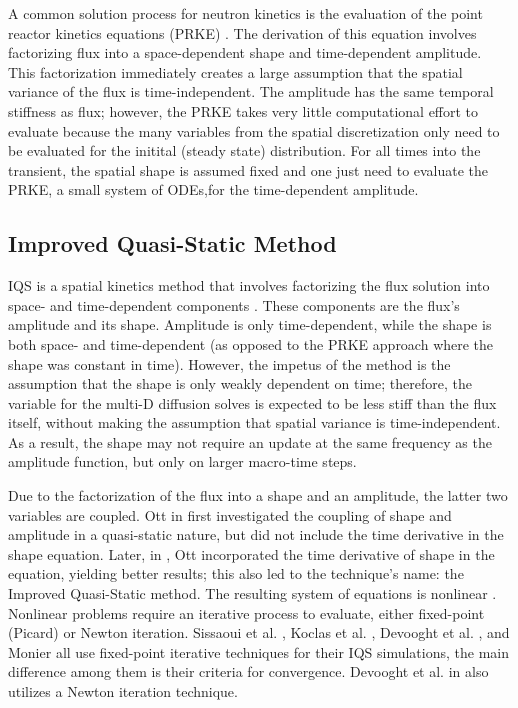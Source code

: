 A common solution process for neutron kinetics is the evaluation of the point reactor kinetics equations (PRKE) \cite{Planchard_1991}.  The derivation of this equation involves factorizing flux into a space-dependent shape and time-dependent amplitude.  This factorization immediately creates a large assumption that the spatial variance of the flux is time-independent.  The amplitude has the same temporal stiffness as flux; however, the PRKE takes very little computational effort to evaluate because the many variables from the spatial discretization only need to be evaluated for the initital (steady state) distribution. For all times into the transient, the spatial shape is assumed fixed and one just need to evaluate the PRKE, a small system of ODEs,for the time-dependent amplitude.


\subsection{Improved Quasi-Static Method}

IQS is a spatial kinetics method that involves factorizing the flux solution into space- and time-dependent components \cite{Ott_1966,Dulla2008,Devooght_1984,Monier_diss,Sissaoui_1995}.  These components are the flux's amplitude and its shape. Amplitude is only time-dependent, while the shape is both space- and time-dependent (as opposed to the PRKE approach where the shape was constant in time).  However, the impetus of the method is the assumption that the shape is only weakly dependent on time; therefore, the variable for the multi-D diffusion solves is expected to be less stiff than the flux itself, without making the assumption that spatial variance is time-independent.  As a result, the shape may not require an update at the same frequency as the amplitude function, but only on larger macro-time steps.  

Due to the factorization of the flux into a shape and an amplitude, the latter two variables are coupled. Ott in \cite{Ott_1966} first investigated the coupling of shape and amplitude in a quasi-static nature, but did not include the time derivative in the shape equation. Later, in \cite{Ott_1969}, Ott incorporated the time derivative of shape in the equation, yielding better results; this also led to the technique's name: the Improved Quasi-Static method.  The resulting system of equations is  nonlinear \cite{Dulla2008}. Nonlinear problems require an iterative process to evaluate, either fixed-point (Picard) or Newton iteration. Sissaoui et al. \cite{Sissaoui_1995}, Koclas et al. \cite{Koclas_1996}, Devooght et al. \cite{Devooght_1984}, and Monier \cite{Monier_diss} all use fixed-point iterative techniques for their IQS simulations, the main difference among them is their criteria for convergence.  Devooght et al. in \cite{Devooght_1984} also utilizes a Newton iteration technique.

